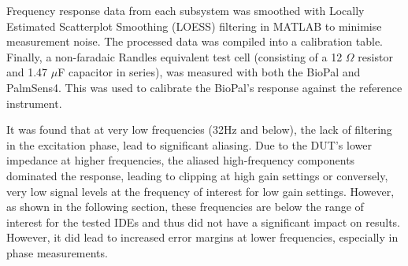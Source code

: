 Frequency response data from each subsystem was smoothed with Locally Estimated Scatterplot Smoothing (LOESS) filtering in MATLAB to minimise measurement noise. The processed data was compiled into a calibration table. Finally, a non-faradaic Randles equivalent test cell (consisting of a 12 $\Omega$ resistor and 1.47 $\mu$F capacitor in series), was measured with both the BioPal and PalmSens4. This was used to calibrate the BioPal's response against the reference instrument. 

It was found that at very low frequencies (32Hz and below), the lack of filtering in the excitation phase, lead to significant aliasing. Due to the \ac{DUT}'s lower impedance at higher frequencies, the aliased high-frequency components dominated the response, leading to clipping at high gain settings or conversely, very low signal levels at the frequency of interest for low gain settings. However, as shown in the following section, these frequencies are below the range of interest for the tested \acp{IDE} and thus did not have a significant impact on results. However, it did lead to increased error margins at lower frequencies, especially in phase measurements.

